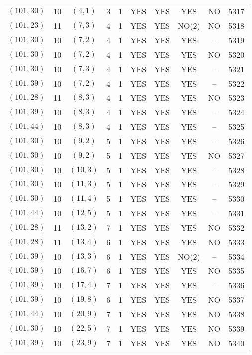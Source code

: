 \begin{longtable}{|c|c|c|c|c|c|c|c|c|c|}
$(101, 30)$ & 10 & $(4, 1)$ & 3 & 1 & YES & YES & YES & NO & 5317\\
$(101, 23)$ & 11 & $(7, 3)$ & 4 & 1 & YES & YES & NO(2) & NO & 5318\\
$(101, 30)$ & 10 & $(7, 2)$ & 4 & 1 & YES & YES & YES & -- & 5319\\
$(101, 30)$ & 10 & $(7, 2)$ & 4 & 1 & YES & YES & YES & NO & 5320\\
$(101, 30)$ & 10 & $(7, 3)$ & 4 & 1 & YES & YES & YES & -- & 5321\\
$(101, 39)$ & 10 & $(7, 2)$ & 4 & 1 & YES & YES & YES & -- & 5322\\
$(101, 28)$ & 11 & $(8, 3)$ & 4 & 1 & YES & YES & YES & NO & 5323\\
$(101, 39)$ & 10 & $(8, 3)$ & 4 & 1 & YES & YES & YES & -- & 5324\\
$(101, 44)$ & 10 & $(8, 3)$ & 4 & 1 & YES & YES & YES & -- & 5325\\
$(101, 30)$ & 10 & $(9, 2)$ & 5 & 1 & YES & YES & YES & -- & 5326\\
$(101, 30)$ & 10 & $(9, 2)$ & 5 & 1 & YES & YES & YES & NO & 5327\\
$(101, 30)$ & 10 & $(10, 3)$ & 5 & 1 & YES & YES & YES & -- & 5328\\
$(101, 30)$ & 10 & $(11, 3)$ & 5 & 1 & YES & YES & YES & -- & 5329\\
$(101, 30)$ & 10 & $(11, 4)$ & 5 & 1 & YES & YES & YES & -- & 5330\\
$(101, 44)$ & 10 & $(12, 5)$ & 5 & 1 & YES & YES & YES & -- & 5331\\
$(101, 28)$ & 11 & $(13, 2)$ & 7 & 1 & YES & YES & YES & NO & 5332\\
$(101, 28)$ & 11 & $(13, 4)$ & 6 & 1 & YES & YES & YES & NO & 5333\\
$(101, 39)$ & 10 & $(13, 3)$ & 6 & 1 & YES & YES & NO(2) & -- & 5334\\
$(101, 39)$ & 10 & $(16, 7)$ & 6 & 1 & YES & YES & YES & NO & 5335\\
$(101, 39)$ & 10 & $(17, 4)$ & 7 & 1 & YES & YES & YES & -- & 5336\\
$(101, 39)$ & 10 & $(19, 8)$ & 6 & 1 & YES & YES & YES & NO & 5337\\
$(101, 44)$ & 10 & $(20, 9)$ & 7 & 1 & YES & YES & YES & NO & 5338\\
$(101, 30)$ & 10 & $(22, 5)$ & 7 & 1 & YES & YES & YES & NO & 5339\\
$(101, 39)$ & 10 & $(23, 9)$ & 7 & 1 & YES & YES & YES & NO & 5340\\

\end{longtable}
